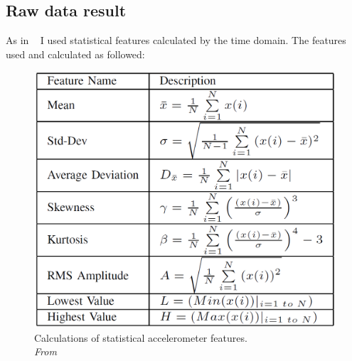 \subsection{Raw data result}
As in ~\cite{sensor:accelPrint} I used statistical features calculated by the time domain. The features used and calculated as followed:
\begin{figure}[H]
	\centering
	\includegraphics[scale=.35]{img/featureCalc}
	\caption{Calculations of statistical accelerometer features. \\\textit{From~\cite[p.6]{sensor:accelPrint}}}
	\label{fig:accFeatures}
\end{figure}


